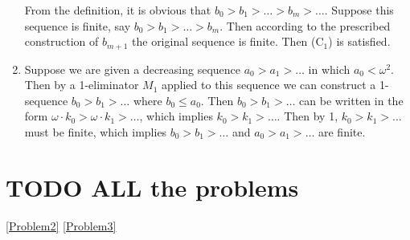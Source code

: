 \documentclass[11pt]{article}
\begin{document}
\begin{enumerate}
From the definition, it is obvious that \(b_0>b_1>\dots>b_m>\dots\). Suppose this sequence is
finite, say \(b_0>b_1>\dots>b_m\). Then according to the prescribed construction
of \(b_{m+1}\) the original sequence is finite. Then (\(\text{C}_1\)) is satisfied.
\item Suppose we are given a decreasing sequence \(a_0>a_1>\dots\) in which \(a_0<\omega^2\). Then by a
1-eliminator \(M_1\) applied to this sequence we can construct a 1-sequence \(b_0>b_1>\dots\)
where \(b_0\le a_0\). Then \(b_0>b_1>\dots\) can be written in the
form \(\omega\cdot k_0>\omega\cdot k_1>\dots\), which implies \(k_0>k_1>\dots\). Then by
1, \(k_0>k_1>\dots\) must be finite, which implies \(b_0>b_1>\dots\) and \(a_0>a_1>\dots\) are finite.
\end{enumerate}
\section{{\bfseries\sffamily TODO} ALL the problems}
\label{sec:org05146ac}

\ref{Problem2}
\ref{Problem3}
\end{document}
